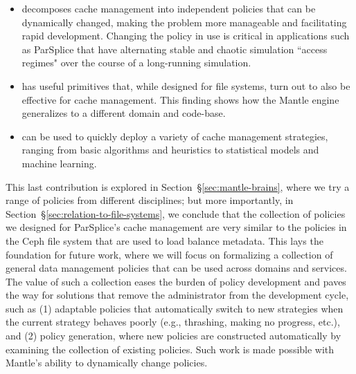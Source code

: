 \begin{itemize}

  \item decomposes cache management into independent policies that can be
  dynamically changed, making the problem more manageable and facilitating rapid
  development. Changing the policy in use is critical in applications such as
  ParSplice that have alternating stable and chaotic simulation ``access regimes"
  over the course of a long-running simulation.  

  \item has useful primitives that, while designed for file systems, turn
  out to also be effective for cache management. This finding shows how the Mantle
  engine generalizes to a different domain and code-base.

  \item can be used to quickly deploy a variety of cache management strategies,
  ranging from basic algorithms and heuristics to statistical models and machine
  learning.

\end{itemize}


This last contribution is explored in Section~\S\ref{sec:mantle-brains}, where
we try a range of policies from different disciplines; but more importantly, in
Section~\S\ref{sec:relation-to-file-systems}, we conclude that the collection
of policies we designed for ParSplice's cache management are very similar to
the policies in the Ceph file system that are used to load balance metadata.
This lays the foundation for future work, where we will focus on formalizing a
collection of general data management policies that can be used across domains
and services. The value of such a collection eases the burden of policy
development and paves the way for solutions that remove the administrator from
the development cycle, such as (1) adaptable policies that automatically switch
to new strategies when the current strategy behaves poorly ({e.g.}, thrashing,
making no progress, etc.), and (2) policy generation, where new policies are
constructed automatically by examining the collection of existing policies.
Such work is made possible with Mantle's ability to dynamically change
policies.


